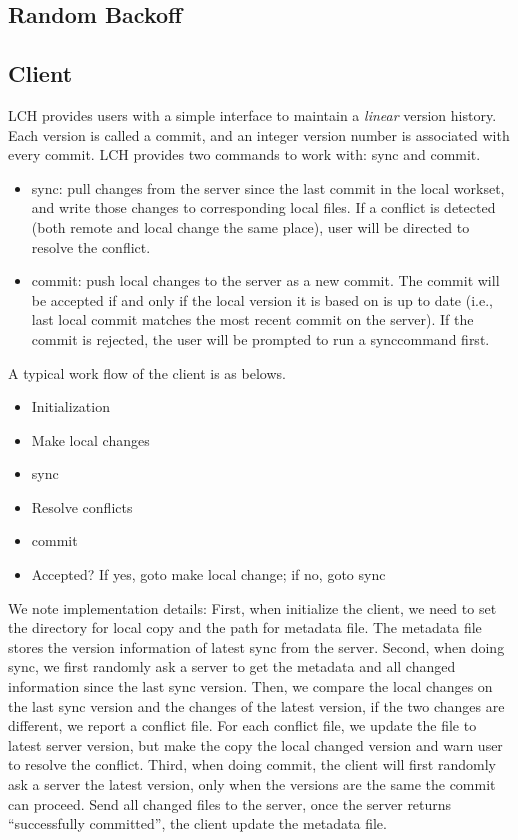 \documentclass[11pt]{article}
\begin{document}
\subsection{Random Backoff}

\subsection{Client}

LCH provides users with a simple interface to maintain a \emph{linear} version history. Each version is called a commit, and an integer version number is associated with every commit. LCH provides two commands to work with: sync and commit. 
\begin{itemize}
  \item sync: pull changes from the server since the last commit in the local workset, and write those changes to corresponding local files. If a conflict is detected (both remote and local change the same place), user will be directed to resolve the conflict.
  \item commit: push local changes to the server as a new commit. The commit will be accepted if and only if the local version it is based on is up to date (i.e., last local commit matches the most recent commit on the server). If the commit is rejected, the user will be prompted to run a synccommand first.

\end{itemize}
A typical work flow of the client is as belows.
\begin{itemize}
  \item Initialization
  \item Make local changes
  \item sync
  \item Resolve conflicts
  \item commit
  \item Accepted? If yes, goto make local change; if no, goto sync
\end{itemize}

We note implementation details: First, when initialize the client, we need to set the directory for local copy and the path for metadata file. The metadata file stores the version information of latest sync from the server. Second, when doing sync, we first randomly ask a server to get the metadata and all changed information since the last sync version. Then, we compare the local changes on the last sync version and the changes of the latest version, if the two changes are different, we report a conflict file. For each conflict file, we update the file to latest server version, but make the copy the local changed version and warn user to resolve the conflict. Third, when doing commit, the client will first randomly ask a server the latest version, only when the versions are the same the commit can proceed. Send all changed files to the server, once the server returns ``successfully committed'', the client update the metadata file.
\end{document}
